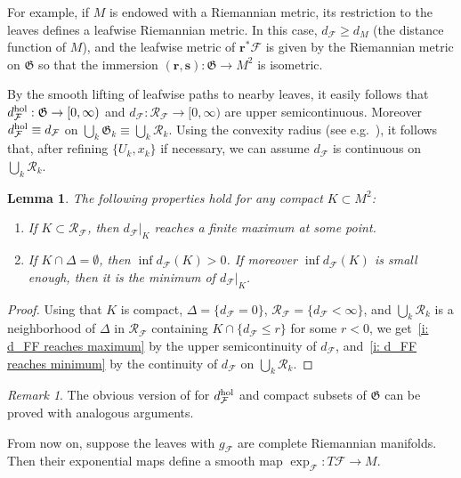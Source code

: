 \documentclass{memo-l}
\theoremstyle{plain}
\newtheorem{lem}[thm]{Lemma}
\theoremstyle{definition}
\theoremstyle{remark}
\newtheorem{rem}[thm]{Remark}
\newcommand{\FF}{\mathcal{F}}
\newcommand{\RR}{\mathcal{R}}
\newcommand{\fG}{\mathfrak{G}}
\newcommand{\bfr}{\boldsymbol{r}}
\newcommand{\bfs}{\boldsymbol{s}}
\numberwithin{section}{chapter}
\numberwithin{equation}{section}%
\begin{document}
For example, if $M$ is endowed with a Riemannian metric, its restriction to the leaves defines a leafwise Riemannian metric. In this case, $d_\FF\ge d_M$ (the distance function of $M$), and the leafwise metric of $\bfr^*\FF$ is given by the Riemannian metric on $\fG$ so that the immersion $(\bfr,\bfs):\fG\to M^2$ is isometric. 

By the smooth lifting of leafwise paths to nearby leaves, it easily follows that $d_\FF^{\text{\rm hol}}:\fG\to[0,\infty)$ and $d_\FF:\RR_\FF\to[0,\infty)$ are upper semicontinuous. Moreover $d_\FF^{\text{\rm hol}}\equiv d_\FF$ on $\bigcup_k\fG_k\equiv\bigcup_k\RR_k$. Using the convexity radius (see e.g.\ \cite[Section~6.3.2]{Petersen1998}), it follows that, after refining $\{U_k,x_k\}$ if necessary, we can assume $d_\FF$ is continuous on $\bigcup_k\RR_k$.

\begin{lem}\label{l: d_FF reaches maximum/minimum}
The following properties hold for any compact $K\subset M^2$:
\begin{enumerate}[{\rm(i)}]
\item\label{i: d_FF reaches maximum} If $K\subset\RR_\FF$, then $d_\FF|_K$ reaches a finite maximum at some point.
\item\label{i: d_FF reaches minimum} If $K\cap\Delta=\emptyset$, then $\inf d_\FF(K)>0$. If moreover $\inf d_\FF(K)$ is small enough, then it is the minimum of $d_\FF|_K$. 
\end{enumerate}
\end{lem}

\begin{proof}
Using that $K$ is compact, $\Delta=\{d_\FF=0\}$, $\RR_\FF=\{d_\FF<\infty\}$, and $\bigcup_k\RR_k$ is a neighborhood of $\Delta$ in $\RR_\FF$ containing $K\cap\{d_\FF\le r\}$ for some $r<0$, we get~\ref{i: d_FF reaches maximum} by the upper semicontinuity of $d_\FF$, and~\ref{i: d_FF reaches minimum} by the continuity of $d_\FF$ on $\bigcup_k\RR_k$.
\end{proof}

\begin{rem}\label{r: d_FF^hol reaches maximum/minimum}
The obvious version of  for $d_\FF^{\text{\rm hol}}$ and compact subsets of $\fG$ can be proved with analogous arguments.
\end{rem}

From now on, suppose the leaves with $g_\FF$ are complete Riemannian manifolds. Then their exponential maps define a smooth map $\exp_\FF:T\FF\to M$.
\end{document}
